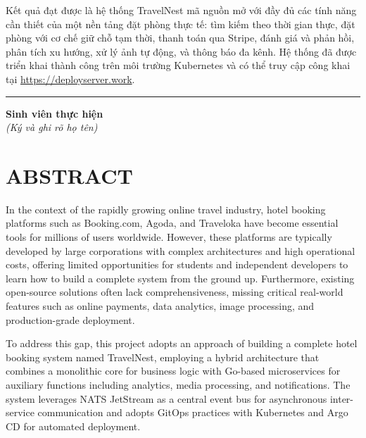 \documentclass[13pt,a4paper,twoside]{report}
\begin{document}
Kết quả đạt được là hệ thống TravelNest mã nguồn mở với đầy đủ các tính năng cần thiết của một nền tảng đặt phòng thực tế: tìm kiếm theo thời gian thực, đặt phòng với cơ chế giữ chỗ tạm thời, thanh toán qua Stripe, đánh giá và phản hồi, phân tích xu hướng, xử lý ảnh tự động, và thông báo đa kênh. Hệ thống đã được triển khai thành công trên môi trường Kubernetes và có thể truy cập công khai tại \url{https://deployserver.work}.

\vspace{1cm}
\begin{flushright}
  \begin{minipage}{5cm}
    \centering
    \hrule
    \textbf{Sinh viên thực hiện}\\[4pt]
    \textit{(Ký và ghi rõ họ tên)}
  \end{minipage}
\end{flushright}

\newpage

\chapter*{ABSTRACT}

In the context of the rapidly growing online travel industry, hotel booking platforms such as Booking.com, Agoda, and Traveloka have become essential tools for millions of users worldwide. However, these platforms are typically developed by large corporations with complex architectures and high operational costs, offering limited opportunities for students and independent developers to learn how to build a complete system from the ground up. Furthermore, existing open-source solutions often lack comprehensiveness, missing critical real-world features such as online payments, data analytics, image processing, and production-grade deployment.

To address this gap, this project adopts an approach of building a complete hotel booking system named TravelNest, employing a hybrid architecture that combines a monolithic core for business logic with Go-based microservices for auxiliary functions including analytics, media processing, and notifications. The system leverages NATS JetStream as a central event bus for asynchronous inter-service communication and adopts GitOps practices with Kubernetes and Argo CD for automated deployment.
\end{document}
